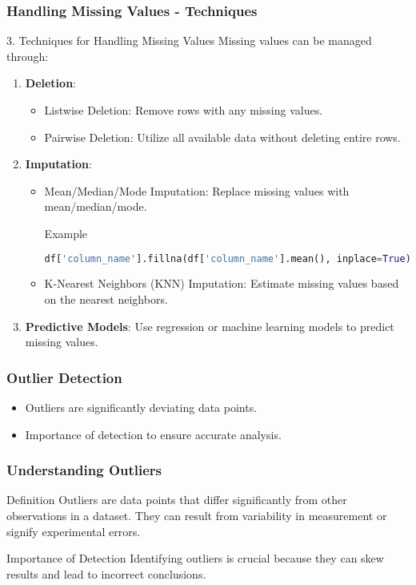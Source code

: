 \documentclass[aspectratio=169]{beamer}
\begin{document}
\begin{frame}
    \frametitle{Handling Missing Values - Techniques}
    \begin{block}{3. Techniques for Handling Missing Values}
        Missing values can be managed through:
        \begin{enumerate}
            \item \textbf{Deletion}:
            \begin{itemize}
                \item Listwise Deletion: Remove rows with any missing values.
                \item Pairwise Deletion: Utilize all available data without deleting entire rows.
            \end{itemize}
            \item \textbf{Imputation}:
            \begin{itemize}
                \item Mean/Median/Mode Imputation: Replace missing values with mean/median/mode.
                \begin{exampleblock}{Example}
                    \begin{lstlisting}[language=Python]
df['column_name'].fillna(df['column_name'].mean(), inplace=True)
                    \end{lstlisting}
                \end{exampleblock}
                \item K-Nearest Neighbors (KNN) Imputation: Estimate missing values based on the nearest neighbors.
            \end{itemize}
            \item \textbf{Predictive Models}: Use regression or machine learning models to predict missing values.
        \end{enumerate}
    \end{block}
\end{frame}

\begin{frame}
  \frametitle{Outlier Detection}
  \begin{itemize}
    \item Outliers are significantly deviating data points.
    \item Importance of detection to ensure accurate analysis.
  \end{itemize}
\end{frame}

\begin{frame}
  \frametitle{Understanding Outliers}
  \begin{block}{Definition}
    Outliers are data points that differ significantly from other observations in a dataset. They can result from variability in measurement or signify experimental errors.
  \end{block}
  \begin{block}{Importance of Detection}
    Identifying outliers is crucial because they can skew results and lead to incorrect conclusions.
  \end{block}
\end{frame}
\end{document}
